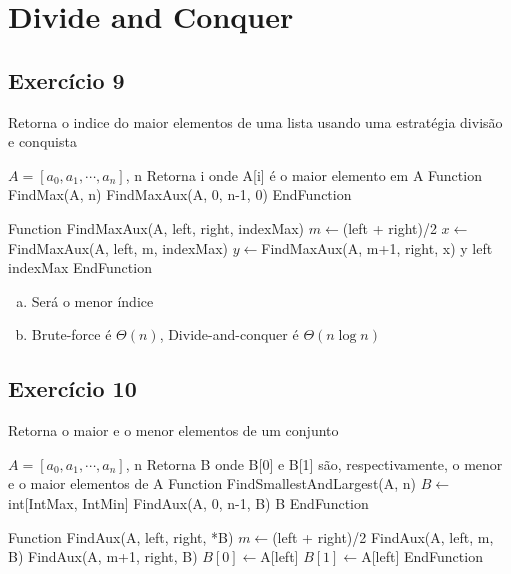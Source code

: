 \section{Divide and Conquer}\label{sec:divide_and_conquer}

\subsection{Exercício 9}\label{sec:exer9}

\begin{algorithm}
  \caption{Retorna o indice do maior elementos de uma lista usando uma estratégia divisão e conquista}
  \begin{algorithmic}
    \REQUIRE $A=[a_{0}, a_{1}, \cdots, a_{n}]$, n
    \ENSURE Retorna i onde A[i] é o maior elemento em A
    \STATE Function FindMax(A, n)
      \RETURN FindMaxAux(A, 0, n-1, 0)
    \STATE EndFunction
    
    \STATE Function FindMaxAux(A, left, right, indexMax)
        \STATE $m \leftarrow $(left + right)/2
        \STATE $x \leftarrow $FindMaxAux(A, left, m, indexMax)
        \STATE $y \leftarrow $FindMaxAux(A, m+1, right, x)
        \RETURN y
      \ELSE
          \RETURN left
        \ELSE
          \RETURN indexMax
        \ENDIF
      \ENDIF
    \STATE EndFunction
  \end{algorithmic}
\end{algorithm}

\begin{enumerate}[a)]
  \item Será o menor índice
  \item Brute-force é $\Theta(n)$, Divide-and-conquer é $\Theta(n\log{}n)$
\end{enumerate}

\subsection{Exercício 10}\label{sec:exer10}

\begin{algorithm}
  \caption{Retorna o maior e o menor elementos de um conjunto}
  \begin{algorithmic}
    \REQUIRE $A=[a_{0}, a_{1}, \cdots, a_{n}]$, n
    \ENSURE Retorna B onde B[0] e B[1] são, respectivamente, o menor e o maior elementos de A
    \STATE Function FindSmallestAndLargest(A, n)
      \STATE $B \leftarrow $int[IntMax, IntMin]
      \STATE FindAux(A, 0, n-1, B)
      \RETURN B
    \STATE EndFunction
    
    \STATE Function FindAux(A, left, right, *B)
        \STATE $m \leftarrow $(left + right)/2
        \STATE FindAux(A, left, m, B)
        \STATE FindAux(A, m+1, right, B)
      \ELSE
          \STATE $B[0] \leftarrow $A[left]
        \ENDIF
          \STATE $B[1] \leftarrow $A[left]
        \ENDIF
      \ENDIF
    \STATE EndFunction
  \end{algorithmic}
\end{algorithm}



